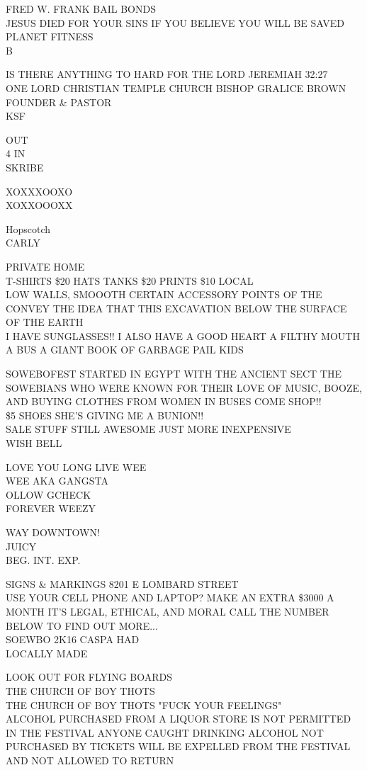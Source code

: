 \documentclass[10pt,letterpaper]{article}
\begin{document}
FRED W. FRANK BAIL BONDS\\
JESUS DIED FOR YOUR SINS IF YOU BELIEVE YOU WILL BE SAVED\\
PLANET FITNESS\\
B

IS THERE ANYTHING TO HARD FOR THE LORD JEREMIAH 32:27\\
ONE LORD CHRISTIAN TEMPLE CHURCH BISHOP GRALICE BROWN FOUNDER \& PASTOR\\
KSF

OUT\\
4 IN\\
SKRIBE

XOXXXOOXO\\
XOXXOOOXX

Hopscotch\\
CARLY

PRIVATE HOME\\
T{-}SHIRTS \$20 HATS TANKS \$20 PRINTS \$10 LOCAL\\
LOW WALLS, SMOOOTH CERTAIN ACCESSORY POINTS OF THE CONVEY THE IDEA THAT THIS EXCAVATION BELOW THE SURFACE OF THE EARTH\\
I HAVE SUNGLASSES!!  I ALSO HAVE A GOOD HEART A FILTHY MOUTH A BUS A GIANT BOOK OF GARBAGE PAIL KIDS

SOWEBOFEST STARTED IN EGYPT WITH THE ANCIENT SECT THE SOWEBIANS WHO WERE KNOWN FOR THEIR LOVE OF MUSIC, BOOZE, AND BUYING CLOTHES FROM WOMEN IN BUSES COME SHOP!!\\
\$5 SHOES SHE'S GIVING ME A BUNION!!\\
SALE STUFF STILL AWESOME JUST MORE INEXPENSIVE\\
WISH BELL

LOVE YOU LONG LIVE WEE\\
WEE AKA GANGSTA\\
OLLOW GCHECK\\
FOREVER WEEZY

WAY DOWNTOWN!\\
JUICY\\
BEG. INT. EXP.

SIGNS \& MARKINGS 8201 E LOMBARD STREET\\
USE YOUR CELL PHONE AND LAPTOP?  MAKE AN EXTRA \$3000 A MONTH IT'S LEGAL, ETHICAL, AND MORAL CALL THE NUMBER BELOW TO FIND OUT MORE...\\
SOEWBO 2K16 CASPA HAD\\
LOCALLY MADE

LOOK OUT FOR FLYING BOARDS\\
THE CHURCH OF BOY THOTS\\
THE CHURCH OF BOY THOTS "FUCK YOUR FEELINGS"\\
ALCOHOL PURCHASED FROM A LIQUOR STORE IS NOT PERMITTED IN THE FESTIVAL ANYONE CAUGHT DRINKING ALCOHOL NOT PURCHASED BY TICKETS WILL BE EXPELLED FROM THE FESTIVAL AND NOT ALLOWED TO RETURN
\end{document}
